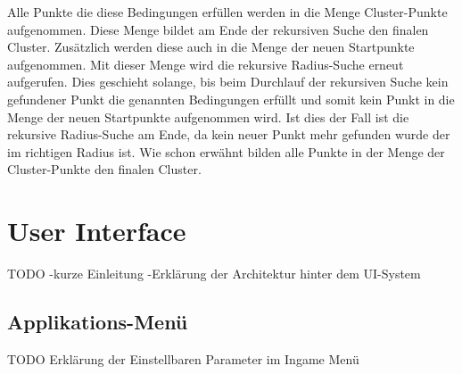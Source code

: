 Alle Punkte die diese Bedingungen erfüllen werden in die Menge Cluster-Punkte aufgenommen. Diese Menge bildet am Ende der rekursiven Suche den finalen Cluster. Zusätzlich werden diese auch in die Menge der neuen Startpunkte aufgenommen. Mit dieser Menge wird die rekursive Radius-Suche erneut aufgerufen. Dies geschieht solange, bis beim Durchlauf der rekursiven Suche kein gefundener Punkt die genannten Bedingungen erfüllt und somit kein Punkt in die Menge der neuen Startpunkte aufgenommen wird. Ist dies der Fall ist die rekursive Radius-Suche am Ende, da kein neuer Punkt mehr gefunden wurde der im richtigen Radius ist. Wie schon erwähnt bilden alle Punkte in der Menge der Cluster-Punkte den finalen Cluster.  

\section{User Interface}
\label{sec:UIMenu}
TODO 
-kurze Einleitung
-Erklärung der Architektur hinter dem UI-System

\subsection{Applikations-Menü}
\label{sec:AppMenu}
TODO Erklärung der Einstellbaren Parameter im Ingame Menü


